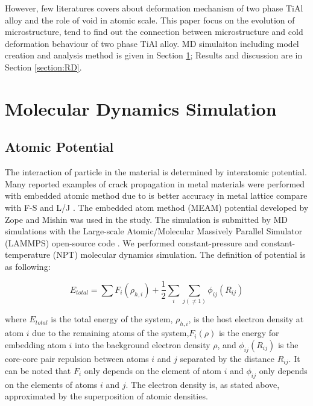 \documentclass[materials,article,submit,moreauthors,pdftex,10pt,a4paper]{Definitions/mdpi}
\begin{document}
However, few literatures covers about deformation mechanism of two phase TiAl alloy and the role of void in atomic scale.
This paper focus on the evolution of microstructure, tend to find out the connection between microstructure and cold deformation behaviour of two phase TiAl alloy. MD simulaiton including model creation and analysis method is given in Section \ref{section:method}; Results and discussion are in Section \ref{section:RD}.

\section{Molecular Dynamics Simulation }\label{section:method}
\subsection{Atomic Potential}

The interaction of particle in the material is determined by interatomic potential. Many reported examples of crack propagation in metal materials were performed with embedded atomic method due to is better accuracy in metal lattice compare with F-S and L/J \cite{Ko2015}. The embedded atom method (MEAM) potential developed by Zope and Mishin \cite{Zope2003} was used in the study. The simulation is submitted by MD simulations with the Large-scale Atomic/Molecular Massively Parallel Simulator (LAMMPS) open-source code \cite{Plimpton1995}. We performed constant-pressure and constant-temperature (NPT) molecular dynamics simulation. The definition of potential is as following:
	
\begin{equation} \label{eq:eam} 
E_{total}= \displaystyle\sum F_i(\rho_{h,i})+\frac{1}{2}\sum_i\sum_{j(\neq1)}\phi_{ij}(R_{ij})
\end{equation}
	
where $E_{total}$ is the total energy of the system, $\rho_{h,i}$, is the host electron density at atom $i$ due to the remaining atoms of the system,$F_i(\rho)$ is the energy for embedding atom $i$ into the background electron density $\rho$, and $\phi_{ij}(R_{ij})$ is the core-core pair repulsion between atoms $i$ and $j$ separated by the distance $R_{ij}$. It can be noted that $F_i$ only depends on the element of atom $i$ and $\phi_{ij}$ only depends on the elements of atoms $i$ and $j$. The electron density is, as stated above, approximated by the superposition of atomic densities.
	
%	
\end{document}
